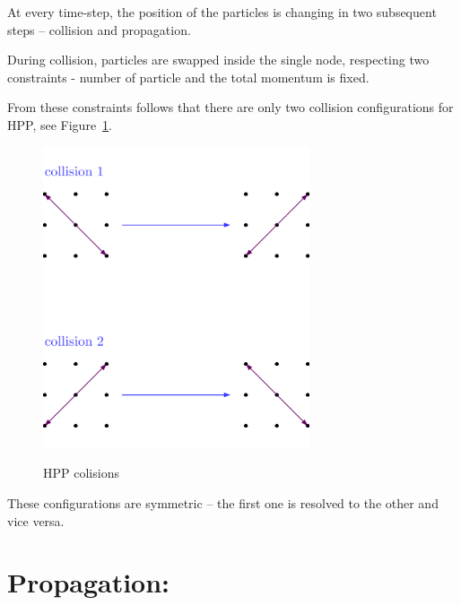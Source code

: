 At every time-step, the position of the particles is changing in two subsequent steps -- collision and propagation.

During collision, particles are swapped inside the single node, respecting two constraints - number of particle and the total momentum is fixed.

From these constraints follows that there are only two collision configurations for HPP, see Figure~\ref{hpp-colision}.

\begin{figure}[H]
 \centering
 \includegraphics[width=0.7\textwidth]{./img/hpp_col}
 \label{hpp-colision}
 \caption{HPP colisions}
\end{figure}

These configurations are symmetric -- the first one is resolved to the other and vice versa.


\section{Propagation:}

